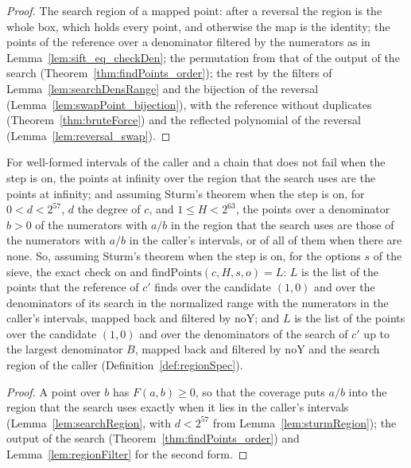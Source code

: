 \begin{proof}
  \leanok
  The search region of a mapped point: after a reversal the region is the whole box, which holds
  every point, and otherwise the map is the identity; the points of the reference over a denominator
  filtered by the numerators as in Lemma~\ref{lem:sift_eq_checkDen}; the permutation from that of
  the output of the search (Theorem~\ref{thm:findPoints_order}); the rest by the filters of
  Lemma~\ref{lem:searchDensRange} and the bijection of the reversal
  (Lemma~\ref{lem:swapPoint_bijection}), with the reference without duplicates
  (Theorem~\ref{thm:bruteForce}) and the reflected polynomial of the reversal
  (Lemma~\ref{lem:reversal_swap}).
\end{proof}

\begin{lemma}\label{lem:elimSearchRegion}
  \leanok
  For well-formed intervals of the caller and a chain that does not fail when the step is on, the
  points at infinity over the region that the search uses are the points at infinity; and assuming
  Sturm's theorem when the step is on, for $0 < d < 2^{57}$, $d$ the degree of $c$, and
  $1 \le H < 2^{63}$, the points over a denominator $b > 0$ of the numerators with $a/b$ in the
  region that the search uses are those of the numerators with $a/b$ in the caller's intervals, or
  of all of them when there are none. So, assuming Sturm's theorem when the step is on, for the
  options $s$ of the sieve, the exact check on and $\mathrm{findPoints}(c, H, s, o) = L$: $L$ is the
  list of the points that the reference of $c'$ finds over the candidate $(1, 0)$ and over the
  denominators of its search in the normalized range with the numerators in the caller's intervals,
  mapped back and filtered by $\mathrm{noY}$; and $L$ is the list of the points over the candidate
  $(1, 0)$ and over the denominators of the search of $c'$ up to the largest denominator $B$, mapped
  back and filtered by $\mathrm{noY}$ and the search region of the caller
  (Definition~\ref{def:regionSpec}).
\end{lemma}

\begin{proof}
  \leanok
  A point over $b$ has $F(a, b) \ge 0$, so that the coverage puts $a/b$ into the region that the
  search uses exactly when it lies in the caller's intervals (Lemma~\ref{lem:searchRegion}, with
  $d < 2^{57}$ from Lemma~\ref{lem:sturmRegion}); the output of the search
  (Theorem~\ref{thm:findPoints_order}) and Lemma~\ref{lem:regionFilter} for the second form.
\end{proof}

